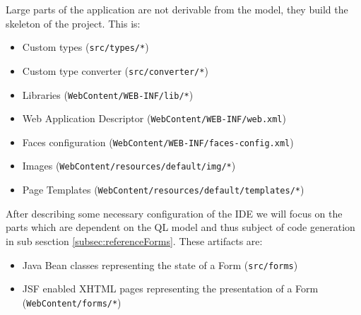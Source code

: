 Large parts of the application are not derivable from the model, they build the skeleton of the project. This is:
\begin{itemize}
\item Custom types (\texttt{src/types/*})
\item Custom type converter (\texttt{src/converter/*})
\item Libraries \newline (\texttt{WebContent/WEB-INF/lib/*})
\item Web Application Descriptor \newline (\texttt{WebContent/WEB-INF/web.xml})
\item Faces configuration \newline
(\texttt{WebContent/WEB-INF/faces-config.xml})
\item Images \newline (\texttt{WebContent/resources/default/img/*})
\item Page Templates \newline
(\texttt{WebContent/resources/default/templates/*})
\end{itemize} 

After describing some necessary configuration of the IDE we will focus on the
parts which are dependent on the QL model and thus subject of code generation
in sub sesction \ref{subsec:referenceForms}.
These artifacts are:
\begin{itemize}
\item Java Bean classes representing the state of a Form (\texttt{src/forms})
\item JSF enabled XHTML pages representing the presentation of a Form (\texttt{WebContent/forms/*})
\end{itemize}